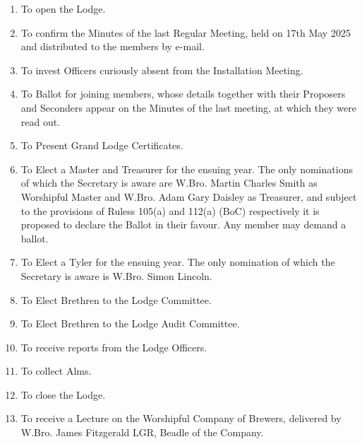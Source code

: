 \begin{enumerate}
  \item To open the Lodge.
  \item To confirm the Minutes of the last Regular Meeting, held on 17th May 2025 and distributed to the members by e-mail.
  \item To invest Officers curiously absent from the Installation Meeting.
  \item To Ballot for joining members, whose details together with their Proposers and Seconders appear on the Minutes of the last meeting, at which they were read out.
  \item To Present Grand Lodge Certificates.
  \item To Elect a Master and Treasurer for the ensuing year. The only nominations of which the Secretary is aware are W.Bro. Martin Charles Smith as Worshipful Master and W.Bro. Adam Gary Daisley as Treasurer, and subject to the provisions of  Ruless 105(a) and 112(a) (BoC) respectively it is proposed to declare the Ballot in their favour. Any member may demand a ballot.
  \item To Elect a Tyler for the ensuing year. The only nomination of which the Secretary is aware is W.Bro. Simon Lincoln.
  \item To Elect Brethren to the Lodge Committee.
  \item To Elect Brethren to the Lodge Audit Committee.
  \item To receive reports from the Lodge Officers.
  \item To collect Alms.
  \item To close the Lodge.
  \item To receive a Lecture on the Worshipful Company of Brewers, delivered by W.Bro. James Fitzgerald LGR, Beadle of the Company.
\end{enumerate}